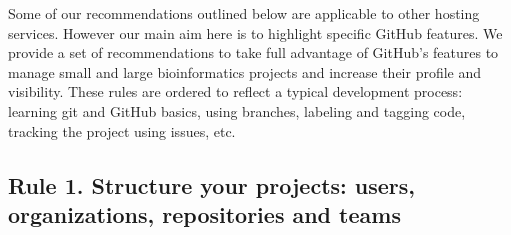 \documentclass[10pt,letterpaper]{article}
\begin{document}
Some of our recommendations outlined below are applicable to other
hosting services. However our main aim here is to highlight specific
GitHub features. We provide a set of recommendations to take full
advantage of GitHub's features to manage small and large bioinformatics
projects and increase their profile and visibility. These rules are
ordered to reflect a typical development process: learning git and
GitHub basics, using branches, labeling and tagging code, tracking the project using
issues, etc.

\subsection*{Rule 1. Structure your projects: users, organizations,
repositories and
teams}\label{rule-1.-structure-your-projects-users-organisations-repositories-and-teams}
\end{document}
